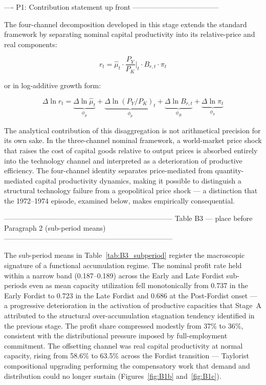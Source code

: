 \documentclass[11pt,a4paper]{article}
\begin{document}
{ ---- P1: Contribution statement up front ------------------------------------

The four-channel decomposition developed in this stage extends the
standard \citet{Weisskopf1979} framework by separating nominal capital
productivity into its relative-price and real components:

\begin{equation}
	r_t = \hat{\mu}_t \cdot \frac{P_Y}{P_K}\bigg|_t \cdot B_{r,t} \cdot \pi_t
	\label{eq:4ch_identity}
\end{equation}

or in log-additive growth form:

\begin{equation}
	\Delta\ln r_t = \underbrace{\Delta\ln\hat{\mu}_t}_{\phi_\mu}
	+ \underbrace{\Delta\ln(P_Y/P_K)_t}_{\phi_{p}}
	+ \underbrace{\Delta\ln B_{r,t}}_{\phi_{B}}
	+ \underbrace{\Delta\ln\pi_t}_{\phi_\pi}
	\label{eq:4ch_log}
\end{equation}

The analytical contribution of this disaggregation is not arithmetical
precision for its own sake. In the three-channel nominal framework, a
world-market price shock that raises the cost of capital goods relative
to output prices is absorbed entirely into the technology channel and
interpreted as a deterioration of productive efficiency. The four-channel
identity separates price-mediated from quantity-mediated capital
productivity dynamics, making it possible to distinguish a structural
technology failure from a geopolitical price shock --- a distinction that
the 1972--1974 episode, examined below, makes empirically consequential.

 -----------------------------------------------------------------------
 Table B3 — place before Paragraph 2 (sub-period means)
 -----------------------------------------------------------------------



The sub-period means in Table~\ref{tab:B3_subperiod} register the
macroscopic signature of a functional accumulation regime. The nominal
profit rate held within a narrow band (0.187--0.189) across the Early and
Late Fordist sub-periods even as mean capacity utilization fell
monotonically from 0.737 in the Early Fordist to 0.723 in the Late Fordist
and 0.686 at the Post-Fordist onset --- a progressive deterioration in the
activation of productive capacities that Stage~A attributed to the
structural over-accumulation stagnation tendency identified in the previous
stage. The profit share compressed modestly from 37\% to 36\%, consistent
with the distributional pressure imposed by full-employment commitment.
The offsetting channel was real capital productivity at normal capacity,
rising from 58.6\% to 63.5\% across the Fordist transition ---
Taylorist compositional upgrading performing the compensatory work that
demand and distribution could no longer sustain
(Figures~\ref{fig:B1b} and~\ref{fig:B1c}).

}
\end{document}
